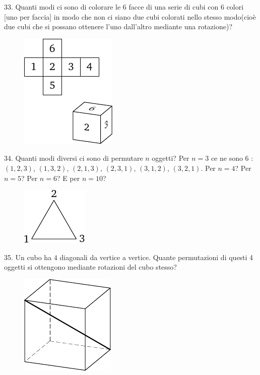 \begin{problem}{33.}
	Quanti modi ci sono di colorare le $6$ facce di una serie di cubi con 6 colori [uno per faccia]  in modo che non ci siano due cubi colorati nello stesso modo(cioè due cubi che si possano ottenere l’uno dall’altro mediante una rotazione)?
	\begin{figure}
		\includegraphics{resources/taskbook-17}
	\end{figure}
\end{problem}

\begin{problem}{34.}
	Quanti modi diversi ci sono di permutare $n$ oggetti?
	Per $n=3$ ce ne sono 6 : $(1,2,3)$, $(1,3,2)$, $(2,1,3)$, $(2,3,1)$, $(3,1,2)$, $(3,2,1)$. Per $n=4$? Per $n=5$? Per $n=6$? E per $n=10$?
	\begin{figure}
		\includegraphics{resources/taskbook-18}
	\end{figure}
\end{problem}

\begin{problem}{35.}
	Un cubo ha $4$ diagonali da vertice a vertice. Quante permutazioni di questi 4 oggetti si ottengono mediante rotazioni del cubo stesso?
	\begin{figure}
		\includegraphics{resources/taskbook-19}
	\end{figure}
\end{problem}

